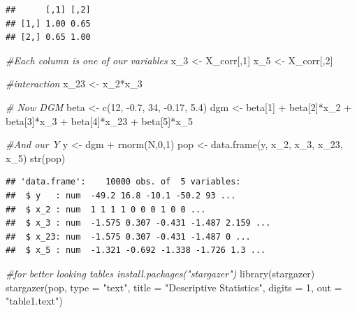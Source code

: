 \documentclass[
]{book}
\newenvironment{Shaded}{\begin{snugshade}}{\end{snugshade}}
\newcommand{\AttributeTok}[1]{\textcolor[rgb]{0.77,0.63,0.00}{#1}}
\newcommand{\CommentTok}[1]{\textcolor[rgb]{0.56,0.35,0.01}{\textit{#1}}}
\newcommand{\DecValTok}[1]{\textcolor[rgb]{0.00,0.00,0.81}{#1}}
\newcommand{\FloatTok}[1]{\textcolor[rgb]{0.00,0.00,0.81}{#1}}
\newcommand{\FunctionTok}[1]{\textcolor[rgb]{0.00,0.00,0.00}{#1}}
\newcommand{\NormalTok}[1]{#1}
\newcommand{\OtherTok}[1]{\textcolor[rgb]{0.56,0.35,0.01}{#1}}
\newcommand{\SpecialCharTok}[1]{\textcolor[rgb]{0.00,0.00,0.00}{#1}}
\newcommand{\StringTok}[1]{\textcolor[rgb]{0.31,0.60,0.02}{#1}}
\begin{document}
\begin{verbatim}
##      [,1] [,2]
## [1,] 1.00 0.65
## [2,] 0.65 1.00
\end{verbatim}

\begin{Shaded}
\begin{Highlighting}[]
\CommentTok{\#Each column is one of our variables}
\NormalTok{x\_3 }\OtherTok{\textless{}{-}}\NormalTok{ X\_corr[,}\DecValTok{1}\NormalTok{]}
\NormalTok{x\_5 }\OtherTok{\textless{}{-}}\NormalTok{ X\_corr[,}\DecValTok{2}\NormalTok{]}

\CommentTok{\#interaction}
\NormalTok{x\_23 }\OtherTok{\textless{}{-}}\NormalTok{ x\_2}\SpecialCharTok{*}\NormalTok{x\_3}
  
\CommentTok{\# Now DGM}
\NormalTok{beta }\OtherTok{\textless{}{-}} \FunctionTok{c}\NormalTok{(}\DecValTok{12}\NormalTok{, }\SpecialCharTok{{-}}\FloatTok{0.7}\NormalTok{, }\DecValTok{34}\NormalTok{, }\SpecialCharTok{{-}}\FloatTok{0.17}\NormalTok{, }\FloatTok{5.4}\NormalTok{)}
\NormalTok{dgm }\OtherTok{\textless{}{-}}\NormalTok{ beta[}\DecValTok{1}\NormalTok{] }\SpecialCharTok{+}\NormalTok{ beta[}\DecValTok{2}\NormalTok{]}\SpecialCharTok{*}\NormalTok{x\_2 }\SpecialCharTok{+}\NormalTok{ beta[}\DecValTok{3}\NormalTok{]}\SpecialCharTok{*}\NormalTok{x\_3 }\SpecialCharTok{+}\NormalTok{ beta[}\DecValTok{4}\NormalTok{]}\SpecialCharTok{*}\NormalTok{x\_23 }\SpecialCharTok{+}\NormalTok{ beta[}\DecValTok{5}\NormalTok{]}\SpecialCharTok{*}\NormalTok{x\_5}

\CommentTok{\#And our Y}
\NormalTok{y }\OtherTok{\textless{}{-}}\NormalTok{ dgm }\SpecialCharTok{+} \FunctionTok{rnorm}\NormalTok{(N,}\DecValTok{0}\NormalTok{,}\DecValTok{1}\NormalTok{)}
\NormalTok{pop }\OtherTok{\textless{}{-}} \FunctionTok{data.frame}\NormalTok{(y, x\_2, x\_3, x\_23, x\_5)}
\FunctionTok{str}\NormalTok{(pop)}
\end{Highlighting}
\end{Shaded}

\begin{verbatim}
## 'data.frame':    10000 obs. of  5 variables:
##  $ y   : num  -49.2 16.8 -10.1 -50.2 93 ...
##  $ x_2 : num  1 1 1 1 0 0 0 1 0 0 ...
##  $ x_3 : num  -1.575 0.307 -0.431 -1.487 2.159 ...
##  $ x_23: num  -1.575 0.307 -0.431 -1.487 0 ...
##  $ x_5 : num  -1.321 -0.692 -1.338 -1.726 1.3 ...
\end{verbatim}

\begin{Shaded}
\begin{Highlighting}[]
\CommentTok{\#for better looking tables install.packages("stargazer")}
\FunctionTok{library}\NormalTok{(stargazer)}
\FunctionTok{stargazer}\NormalTok{(pop, }\AttributeTok{type =} \StringTok{"text"}\NormalTok{, }\AttributeTok{title =} \StringTok{"Descriptive Statistics"}\NormalTok{,}
          \AttributeTok{digits =} \DecValTok{1}\NormalTok{, }\AttributeTok{out =} \StringTok{"table1.text"}\NormalTok{)}
\end{Highlighting}
\end{Shaded}
\end{document}
